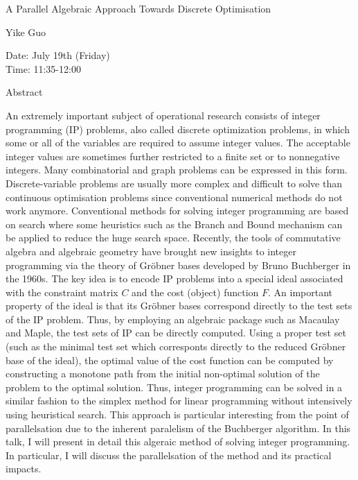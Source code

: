 \begin{center}
\LARGE
A Parallel Algebraic Approach Towards Discrete
                          Optimisation

\end{center}

\begin{center}
\Large
Yike Guo

\end{center}

\noindent
Date:  July 19th (Friday)\\
Time:  11:35-12:00\\

\begin{center}
\large
Abstract
\end{center}

An extremely important subject of operational research consists of integer programming (IP)
problems, also called discrete optimization problems, in which some or all of the variables are
required to assume integer values. The acceptable integer values are sometimes further restricted
to a finite set or to nonnegative integers. Many combinatorial and graph problems can be expressed
in this form. Discrete-variable problems are usually more complex and difficult to solve than
continuous optimisation problems since conventional numerical methods do not work anymore.
Conventional methods for solving integer programming are based on search where some heuristics
such as the Branch and Bound mechanism can be applied to reduce the huge search space. Recently,
the tools of commutative algebra and algebraic geometry have brought new insights to integer
programming via the theory of Gr\"obner bases developed by Bruno Buchberger in the 1960s. The
key idea is to encode IP problems into a special ideal associated with the constraint matrix $C$ and
the cost (object) function $F$. An important property of the ideal is that its Gr\"obner bases
correspond directly to the test sets of the IP problem. Thus, by employing an algebraic package
such as Macaulay and Maple, the test sets of IP can be directly computed. Using a proper test set
(such as the minimal test set which corresponts directly to the reduced Gr\"obner base of the ideal),
the optimal value of the cost function can be computed by constructing a monotone path from the
initial non-optimal solution of the problem to the optimal solution. Thus, integer programming
can be solved in a similar fashion to the simplex method for linear programming without
intensively using heuristical search. This approach is particular interesting from the point of
parallelsation due to the inherent paralelism of the Buchberger algorithm. In this talk, I will
present in detail this algeraic method of solving integer programming. In particular, I will discuss
the parallelsation of the method and its practical impacts. 

